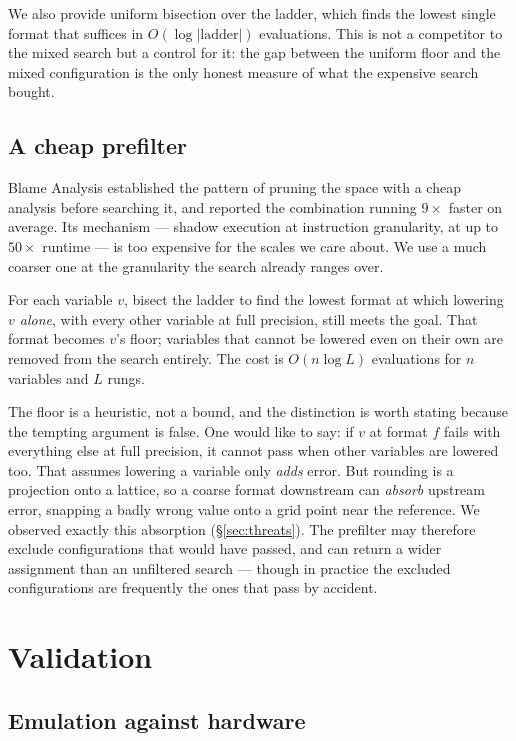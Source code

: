 \documentclass[11pt]{article}
\begin{document}
We also provide uniform bisection over the ladder, which finds the lowest single
format that suffices in $O(\log |\text{ladder}|)$ evaluations. This is not a
competitor to the mixed search but a control for it: the gap between the uniform
floor and the mixed configuration is the only honest measure of what the
expensive search bought.

\subsection{A cheap prefilter}
\label{sec:prefilter}

Blame Analysis established the pattern of pruning the space with a cheap analysis
before searching it, and reported the combination running $9\times$ faster on
average. Its mechanism --- shadow execution at instruction granularity, at up to
$50\times$ runtime --- is too expensive for the scales we care about. We use a
much coarser one at the granularity the search already ranges over.

For each variable $v$, bisect the ladder to find the lowest format at which
lowering \emph{$v$ alone}, with every other variable at full precision, still
meets the goal. That format becomes $v$'s floor; variables that cannot be lowered
even on their own are removed from the search entirely. The cost is $O(n \log L)$
evaluations for $n$ variables and $L$ rungs.

The floor is a heuristic, not a bound, and the distinction is worth stating because
the tempting argument is false. One would like to say: if $v$ at format $f$ fails
with everything else at full precision, it cannot pass when other variables are
lowered too. That assumes lowering a variable only \emph{adds} error. But
rounding is a projection onto a lattice, so a coarse format downstream can
\emph{absorb} upstream error, snapping a badly wrong value onto a grid point near
the reference. We observed exactly this absorption (\S\ref{sec:threats}). The
prefilter may
therefore exclude configurations that would have passed, and can return a wider
assignment than an unfiltered search --- though in practice the excluded
configurations are frequently the ones that pass by accident.

\section{Validation}
\label{sec:validation}

\subsection{Emulation against hardware}
\end{document}
